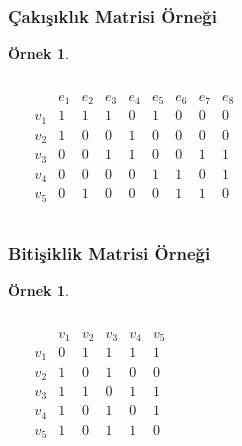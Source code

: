 \documentclass[dvipsnames]{beamer}
\theoremstyle{definition}
\theoremstyle{example}
\newtheorem{ornek}[theorem]{Örnek}
\theoremstyle{plain}
\begin{document}
\begin{frame}
  \frametitle{Çakışıklık Matrisi Örneği}

  \begin{ornek}
    \begin{columns}
      \begin{center}
      \end{center}

      \[
        \begin{array}{c|cccccccc}
              & e_1 & e_2 & e_3 & e_4 & e_5 & e_6 & e_7 & e_8\\\hline
          v_1 & 1 & 1 & 1 & 0 & 1 & 0 & 0 & 0\\
          v_2 & 1 & 0 & 0 & 1 & 0 & 0 & 0 & 0\\
          v_3 & 0 & 0 & 1 & 1 & 0 & 0 & 1 & 1\\
          v_4 & 0 & 0 & 0 & 0 & 1 & 1 & 0 & 1\\
          v_5 & 0 & 1 & 0 & 0 & 0 & 1 & 1 & 0
        \end{array}
      \]
    \end{columns}
  \end{ornek}
\end{frame}

\begin{frame}
  \frametitle{Bitişiklik Matrisi Örneği}

  \begin{ornek}
    \begin{columns}
      \begin{center}
      \end{center}

      \[
        \begin{array}{c|ccccc}
                & v_1 & v_2 & v_3 & v_4 & v_5\\\hline
            v_1 & 0 & 1 & 1 & 1 & 1\\
            v_2 & 1 & 0 & 1 & 0 & 0\\
            v_3 & 1 & 1 & 0 & 1 & 1\\
            v_4 & 1 & 0 & 1 & 0 & 1\\
            v_5 & 1 & 0 & 1 & 1 & 0
        \end{array}
      \]
    \end{columns}
  \end{ornek}
\end{frame}
\end{document}
